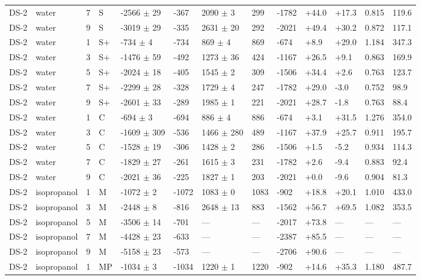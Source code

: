 \documentclass[11pt,a4paper]{article}
\begin{document}
\begin{landscape}
{\begin{longtable}{@{}lllllllllllll@{}}
DS-2 & water & 7 & S & -2566 $\pm$ 29 & -367 & 2090 $\pm$ 3 & 299 & -1782 & +44.0 & +17.3 & 0.815 & 119.6 \\
DS-2 & water & 9 & S & -3019 $\pm$ 29 & -335 & 2631 $\pm$ 20 & 292 & -2021 & +49.4 & +30.2 & 0.872 & 117.1 \\
DS-2 & water & 1 & S+ & -734 $\pm$ 4 & -734 & 869 $\pm$ 4 & 869 & -674 & +8.9 & +29.0 & 1.184 & 347.3 \\
DS-2 & water & 3 & S+ & -1476 $\pm$ 59 & -492 & 1273 $\pm$ 36 & 424 & -1167 & +26.5 & +9.1 & 0.863 & 169.9 \\
DS-2 & water & 5 & S+ & -2024 $\pm$ 18 & -405 & 1545 $\pm$ 2 & 309 & -1506 & +34.4 & +2.6 & 0.763 & 123.7 \\
DS-2 & water & 7 & S+ & -2299 $\pm$ 28 & -328 & 1729 $\pm$ 4 & 247 & -1782 & +29.0 & -3.0 & 0.752 & 98.9 \\
DS-2 & water & 9 & S+ & -2601 $\pm$ 33 & -289 & 1985 $\pm$ 1 & 221 & -2021 & +28.7 & -1.8 & 0.763 & 88.4 \\
DS-2 & water & 1 & C & -694 $\pm$ 3 & -694 & 886 $\pm$ 4 & 886 & -674 & +3.1 & +31.5 & 1.276 & 354.0 \\
DS-2 & water & 3 & C & -1609 $\pm$ 309 & -536 & 1466 $\pm$ 280 & 489 & -1167 & +37.9 & +25.7 & 0.911 & 195.7 \\
DS-2 & water & 5 & C & -1528 $\pm$ 19 & -306 & 1428 $\pm$ 2 & 286 & -1506 & +1.5 & -5.2 & 0.934 & 114.3 \\
DS-2 & water & 7 & C & -1829 $\pm$ 27 & -261 & 1615 $\pm$ 3 & 231 & -1782 & +2.6 & -9.4 & 0.883 & 92.4 \\
DS-2 & water & 9 & C & -2021 $\pm$ 36 & -225 & 1827 $\pm$ 1 & 203 & -2021 & +0.0 & -9.6 & 0.904 & 81.3 \\
DS-2 & isopropanol & 1 & M & -1072 $\pm$ 2 & -1072 & 1083 $\pm$ 0 & 1083 & -902 & +18.8 & +20.1 & 1.010 & 433.0 \\
DS-2 & isopropanol & 3 & M & -2448 $\pm$ 8 & -816 & 2648 $\pm$ 13 & 883 & -1562 & +56.7 & +69.5 & 1.082 & 353.5 \\
DS-2 & isopropanol & 5 & M & -3506 $\pm$ 14 & -701 & --- & --- & -2017 & +73.8 & --- & --- & --- \\
DS-2 & isopropanol & 7 & M & -4428 $\pm$ 23 & -633 & --- & --- & -2387 & +85.5 & --- & --- & --- \\
DS-2 & isopropanol & 9 & M & -5158 $\pm$ 23 & -573 & --- & --- & -2706 & +90.6 & --- & --- & --- \\
DS-2 & isopropanol & 1 & MP & -1034 $\pm$ 3 & -1034 & 1220 $\pm$ 1 & 1220 & -902 & +14.6 & +35.3 & 1.180 & 487.7 \\

\end{longtable}}
\end{landscape}
\end{document}
